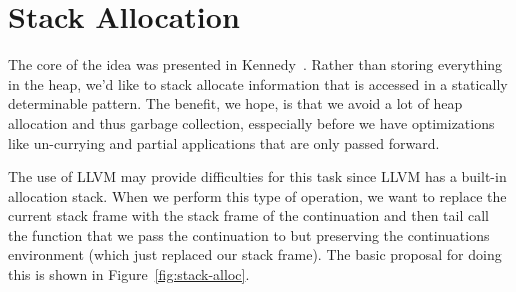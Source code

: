 \documentclass{article}
\begin{document}


\section{Stack Allocation}
\label{sec:stack-alloc}
The core of the idea was presented in Kennedy~\cite{kennedy07cps}. Rather than storing everything in the heap, we'd like to stack allocate information that is accessed in a statically determinable pattern. The benefit, we hope, is that we avoid a lot of heap allocation and thus garbage collection, esspecially before we have optimizations like un-currying and partial applications that are only passed forward.

The use of LLVM may provide difficulties for this task since LLVM has a built-in allocation stack. When we perform this type of operation, we want to replace the current stack frame with the stack frame of the continuation and then tail call the function that we pass the continuation to but preserving the continuations environment (which just replaced our stack frame). The basic proposal for doing this is shown in Figure~\ref{fig:stack-alloc}. 
\end{document}
